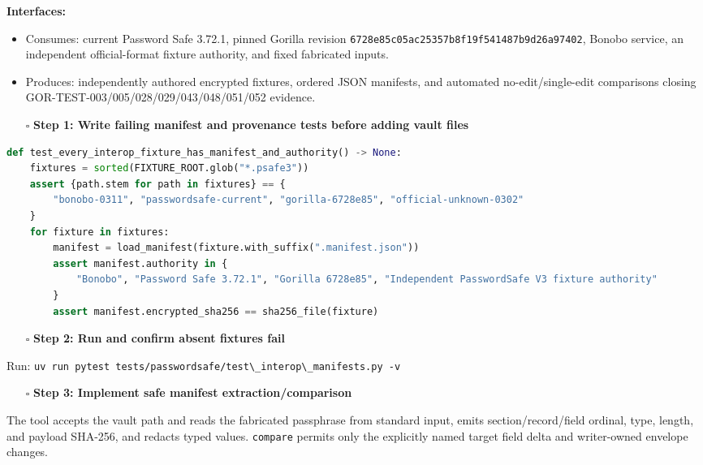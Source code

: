 \documentclass[
  letterpaper,
]{article}
\newcommand{\passthrough}[1]{#1}
\providecommand{\tightlist}{%
  \setlength{\itemsep}{0pt}\setlength{\parskip}{0pt}}
\begin{document}
\textbf{Interfaces:}

\begin{itemize}
\tightlist
\item
  Consumes: current Password Safe 3.72.1, pinned Gorilla revision \nolinkurl{6728e85c05ac25357b8f19f541487b9d26a97402},
  Bonobo service, an independent official-format fixture authority, and fixed fabricated inputs.
\item
  Produces: independently authored encrypted fixtures, ordered JSON manifests, and automated no-edit/single-edit
  comparisons closing GOR-TEST-003/005/028/029/043/048/051/052 evidence.
\end{itemize}

\begin{itemize}
\tightlist
\item[$\square$]
  \textbf{Step 1: Write failing manifest and provenance tests before adding vault files}
\end{itemize}

\begin{lstlisting}[language=Python]
def test_every_interop_fixture_has_manifest_and_authority() -> None:
    fixtures = sorted(FIXTURE_ROOT.glob("*.psafe3"))
    assert {path.stem for path in fixtures} == {
        "bonobo-0311", "passwordsafe-current", "gorilla-6728e85", "official-unknown-0302"
    }
    for fixture in fixtures:
        manifest = load_manifest(fixture.with_suffix(".manifest.json"))
        assert manifest.authority in {
            "Bonobo", "Password Safe 3.72.1", "Gorilla 6728e85", "Independent PasswordSafe V3 fixture authority"
        }
        assert manifest.encrypted_sha256 == sha256_file(fixture)
\end{lstlisting}

\begin{itemize}
\tightlist
\item[$\square$]
  \textbf{Step 2: Run and confirm absent fixtures fail}
\end{itemize}

Run: \passthrough{\lstinline!uv run pytest tests/passwordsafe/test\_interop\_manifests.py -v!}

\begin{itemize}
\tightlist
\item[$\square$]
  \textbf{Step 3: Implement safe manifest extraction/comparison}
\end{itemize}

The tool accepts the vault path and reads the fabricated passphrase from standard input, emits section/record/field
ordinal, type, length, and payload SHA-256, and redacts typed values. \passthrough{\lstinline!compare!} permits only the
explicitly named target field delta and writer-owned envelope changes.
\end{document}
